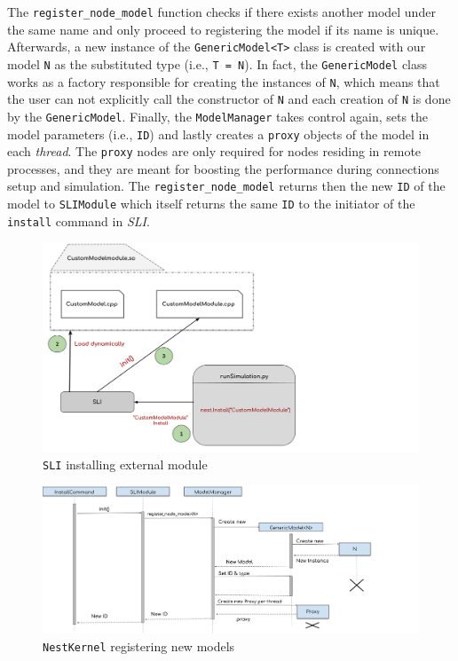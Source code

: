 The \texttt{register\_node\_model} function checks if there exists another model under the same name and only proceed to registering the model if its name is unique. Afterwards, a new instance of the \texttt{GenericModel<T>} class is created with our model \texttt{N} as the substituted type (i.e., \texttt{T = N}). In fact, the \texttt{GenericModel} class works as a factory responsible for creating the instances of \texttt{N}, which means that  the user can not explicitly call the constructor of \texttt{N} and each creation of \texttt{N} is done by the \texttt{GenericModel}. Finally, the \texttt{ModelManager} takes control again, sets the model parameters (i.e., \texttt{ID}) and lastly creates a \texttt{proxy} objects of the model in each \emph{thread}. The \texttt{proxy} nodes are only required for nodes residing in remote processes, and they are meant for boosting the performance during connections setup and simulation. The \texttt{register\_node\_model} returns then the new \texttt{ID} of the model to \texttt{SLIModule} which itself returns the same \texttt{ID} to the initiator of the \texttt{install} command in \emph{SLI}.
 
 
 \begin{figure}[ht!]
\centering
\includegraphics[width=1.2\textwidth,height=1.2\textheight,keepaspectratio]{src/pic/install_command.png}
\caption{\texttt{SLI} installing external module }
\label{fig:sli_install}
\end{figure}

\vspace{0.5cm}
\begin{figure}[ht!]
\centering
\includegraphics[width=1.2\textwidth,height=1.3\textheight,keepaspectratio]{src/pic/register.png}
\caption{\texttt{NestKernel} registering new models }
\label{fig:nestknerl_register}
\end{figure}

